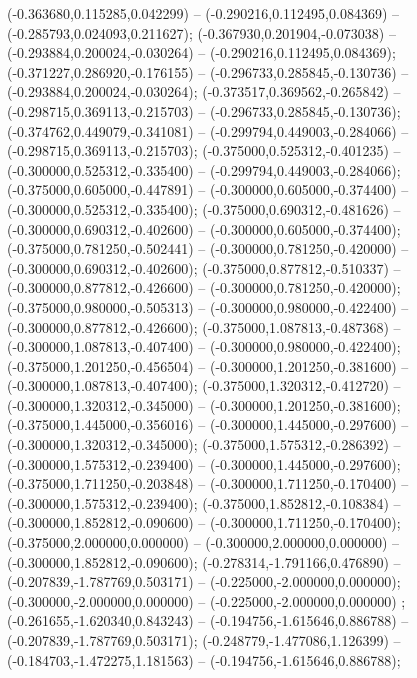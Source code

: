  (-0.363680,0.115285,0.042299) -- (-0.290216,0.112495,0.084369) -- (-0.285793,0.024093,0.211627);
 (-0.367930,0.201904,-0.073038) -- (-0.293884,0.200024,-0.030264) -- (-0.290216,0.112495,0.084369);
 (-0.371227,0.286920,-0.176155) -- (-0.296733,0.285845,-0.130736) -- (-0.293884,0.200024,-0.030264);
 (-0.373517,0.369562,-0.265842) -- (-0.298715,0.369113,-0.215703) -- (-0.296733,0.285845,-0.130736);
 (-0.374762,0.449079,-0.341081) -- (-0.299794,0.449003,-0.284066) -- (-0.298715,0.369113,-0.215703);
 (-0.375000,0.525312,-0.401235) -- (-0.300000,0.525312,-0.335400) -- (-0.299794,0.449003,-0.284066);
 (-0.375000,0.605000,-0.447891) -- (-0.300000,0.605000,-0.374400) -- (-0.300000,0.525312,-0.335400);
 (-0.375000,0.690312,-0.481626) -- (-0.300000,0.690312,-0.402600) -- (-0.300000,0.605000,-0.374400);
 (-0.375000,0.781250,-0.502441) -- (-0.300000,0.781250,-0.420000) -- (-0.300000,0.690312,-0.402600);
 (-0.375000,0.877812,-0.510337) -- (-0.300000,0.877812,-0.426600) -- (-0.300000,0.781250,-0.420000);
 (-0.375000,0.980000,-0.505313) -- (-0.300000,0.980000,-0.422400) -- (-0.300000,0.877812,-0.426600);
 (-0.375000,1.087813,-0.487368) -- (-0.300000,1.087813,-0.407400) -- (-0.300000,0.980000,-0.422400);
 (-0.375000,1.201250,-0.456504) -- (-0.300000,1.201250,-0.381600) -- (-0.300000,1.087813,-0.407400);
 (-0.375000,1.320312,-0.412720) -- (-0.300000,1.320312,-0.345000) -- (-0.300000,1.201250,-0.381600);
 (-0.375000,1.445000,-0.356016) -- (-0.300000,1.445000,-0.297600) -- (-0.300000,1.320312,-0.345000);
 (-0.375000,1.575312,-0.286392) -- (-0.300000,1.575312,-0.239400) -- (-0.300000,1.445000,-0.297600);
 (-0.375000,1.711250,-0.203848) -- (-0.300000,1.711250,-0.170400) -- (-0.300000,1.575312,-0.239400);
 (-0.375000,1.852812,-0.108384) -- (-0.300000,1.852812,-0.090600) -- (-0.300000,1.711250,-0.170400);
 (-0.375000,2.000000,0.000000) -- (-0.300000,2.000000,0.000000) -- (-0.300000,1.852812,-0.090600);
 (-0.278314,-1.791166,0.476890) -- (-0.207839,-1.787769,0.503171) -- (-0.225000,-2.000000,0.000000);
 (-0.300000,-2.000000,0.000000) -- (-0.225000,-2.000000,0.000000) ;
 (-0.261655,-1.620340,0.843243) -- (-0.194756,-1.615646,0.886788) -- (-0.207839,-1.787769,0.503171);
 (-0.248779,-1.477086,1.126399) -- (-0.184703,-1.472275,1.181563) -- (-0.194756,-1.615646,0.886788);
